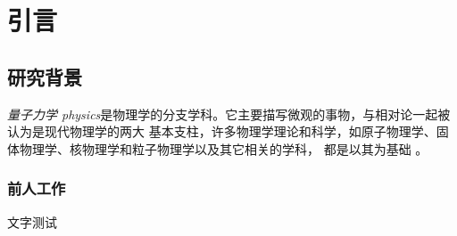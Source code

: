 \chapter{引言}


\section{研究背景}

\emph{量子力学 physics}是物理学的分支学科。它主要描写微观的事物，与相对论一起被认为是现代物理学的两大
基本支柱，许多物理学理论和科学，如原子物理学、固体物理学、核物理学和粒子物理学以及其它相关的学科，
都是以其为基础 \parencite{曾谨言2013量子力学,feynman2011feynman}。



\subsection{前人工作}

文字测试